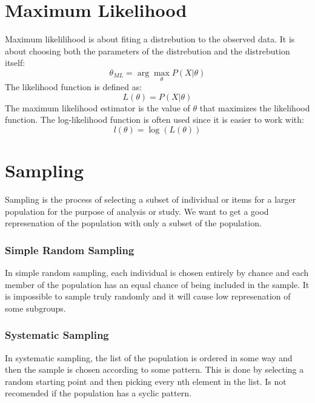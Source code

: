 \section{Maximum Likelihood}
Maximum likelilihood is about fiting a distrebution to the observed data. It is about choosing both the parameters of the distrebution and the distrebution itself:
\begin {equation}
    \theta_{ML} = \arg \max_{\theta} P(X|\theta)
\end{equation}
The likelihood function is defined as:
\begin{equation}
    L(\theta) = P(X|\theta)
\end{equation}
The maximum likelihood estimator is the value of $\theta$ that maximizes the likelihood function. The log-likelihood function is often used since it is easier to work with:
\begin{equation}
    l(\theta) = \log(L(\theta))
\end{equation}



\section{Sampling}
Sampling is the process of selecting a subset of individual or items for a larger population for the purpose of analysis or study. We want to get a good represenation of the population with only a subset of the population. \newline
\subsubsection{Simple Random Sampling}
In simple random sampling, each individual is chosen entirely by chance and each member of the population has an equal chance of being included in the sample. It is impossible to sample truly randomly and it will cause low represenation of some subgroups. \newline

\subsubsection{Systematic Sampling}
In systematic sampling, the list of the population is ordered in some way and then the sample is chosen according to some pattern. This is done by selecting a random starting point and then picking every nth element in the list. Is not recomended if the population has a syclic pattern. \newline

